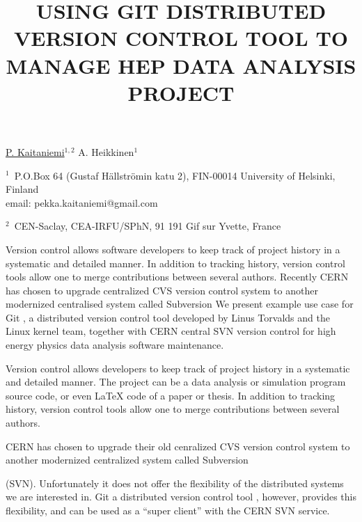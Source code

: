 \documentclass[12pt]{article}
\begin{document}
\title{USING GIT DISTRIBUTED VERSION CONTROL TOOL TO MANAGE HEP DATA ANALYSIS PROJECT}
\underline{P. Kaitaniemi}$^{1, 2}$ A. Heikkinen$^1$ 

$^1$~P.O.Box 64 (Gustaf H\"allstr\"omin katu 2), FIN-00014 University of Helsinki, Finland\\
email: pekka.kaitaniemi@gmail.com

$^2$~CEN-Saclay, CEA-IRFU/SPhN, 91 191 Gif sur Yvette, France
\vspace{\baselineskip}


Version control allows software developers to keep track of project history in
a systematic and detailed manner. 
In addition to tracking history, version control tools allow
one to merge contributions between several authors.
Recently CERN has chosen to upgrade centralized CVS version control
system to another modernized centralised system called Subversion
We present example use case for Git \cite{gitsite}, a distributed version control
tool developed by Linus Torvalds and the Linux kernel team, together
with CERN central SVN \cite{cernsvn} version control for high energy physics data
analysis software maintenance.

Version control allows developers to keep track of project history in
a systematic and detailed manner. The project can be a data analysis
or simulation program source code, or even LaTeX code of a paper or
thesis. In addition to tracking history, version control tools allow
one to merge contributions between several authors.

CERN has chosen to upgrade their old cenralized CVS version control
system to another modernized centralized system called Subversion \cite{svnsite}

(SVN). Unfortunately it does not offer the flexibility of the
distributed systems we are interested in. 
Git a distributed version control tool \cite{torvalds}, however, 
provides this flexibility, 
and can be used as a ``super client'' with the CERN SVN service.
\end{document}
